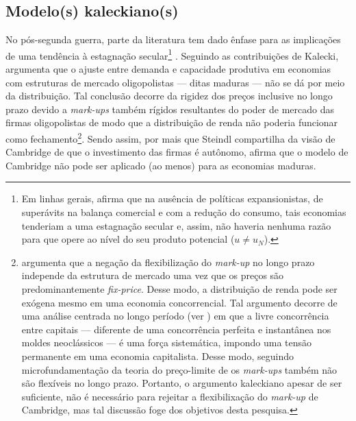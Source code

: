 \subsection{Modelo(s) kaleckiano(s)}

No pós-segunda guerra, parte da literatura tem dado ênfase para 
as implicações de uma tendência à estagnação secular\footnote{Em linhas gerais, \textcite{steindl_stagnation_1979} afirma que na ausência de políticas expansionistas, de superávits na balança comercial e com a redução do consumo,  tais economias tenderiam a uma estagnação secular e, assim,  não haveria nenhuma razão para que opere ao nível do seu produto potencial ($u \neq u_N$).} \cite{setterfield_distribution_2002}.
Seguindo as contribuições de Kalecki, \textcite{steindl_maturity_1952} argumenta que o ajuste entre demanda e capacidade produtiva em economias com  estruturas de mercado oligopolistas --- ditas maduras --- não se dá por meio da distribuição.
Tal conclusão decorre da rigidez dos preços inclusive no longo prazo devido a \textit{mark-ups} também rígidos resultantes do poder de mercado das firmas oligopolistas de modo que a distribuição de renda não poderia funcionar como fechamento\footnote{
	\textcite{serrano_sraffian_1995} argumenta que a negação da flexibilização do \textit{mark-up} no longo prazo independe da estrutura de mercado uma vez que os preços são predominantemente \textit{fix-price}. Desse modo, a distribuição de renda pode ser exógena mesmo em uma economia concorrencial. Tal argumento decorre de uma análise centrada no longo período (ver \textcite{milgate_capital_1982}) em que a livre concorrência entre capitais --- diferente de uma concorrência perfeita e instantânea nos moldes neoclássicos ---  é uma força sistemática, impondo uma tensão permanente em uma economia capitalista. 
	Desse modo, seguindo microfundamentação da teoria do preço-limite de \textcite{labini} os \textit{mark-ups} também não são flexíveis no longo prazo.
	Portanto, o argumento kaleckiano apesar de ser suficiente,  não é necessário para  rejeitar a flexibilixação do \textit{mark-up} de Cambridge, mas tal discussão foge dos objetivos desta pesquisa.
}.
Sendo assim, por mais que Steindl compartilha da visão de Cambridge de que o investimento das firmas é autônomo, afirma que o modelo de Cambridge não pode ser aplicado (ao menos) para as economias maduras.  


